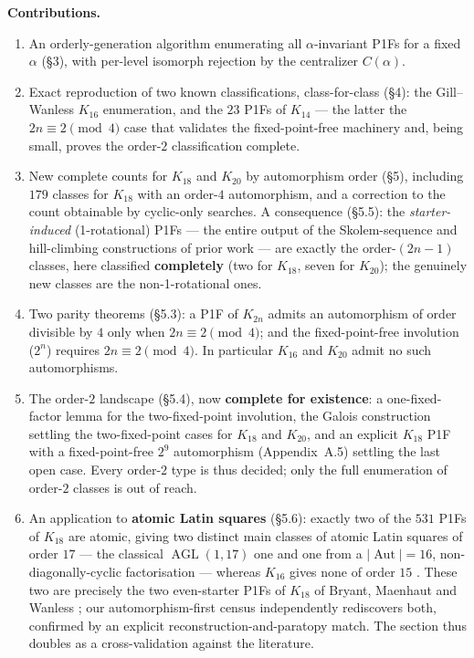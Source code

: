 \documentclass[11pt,reqno]{amsart}
\theoremstyle{plain}
\theoremstyle{definition}
\numberwithin{theorem}{section}
\newcommand{\Aut}{\operatorname{Aut}}
\newcommand{\AGL}{\operatorname{AGL}}
\begin{document}
\medskip
\noindent\textbf{Contributions.}
\begin{enumerate}
\item An orderly-generation algorithm enumerating all $\alpha$-invariant P1Fs for a
fixed $\alpha$ (\S3), with per-level isomorph rejection by the centralizer
$C(\alpha)$.
\item Exact reproduction of two known classifications, class-for-class (\S4): the
Gill--Wanless $K_{16}$ enumeration, and the $23$ P1Fs of $K_{14}$ --- the latter the
$2n\equiv 2\pmod 4$ case that validates the fixed-point-free machinery and, being
small, proves the order-$2$ classification complete.
\item New complete counts for $K_{18}$ and $K_{20}$ by automorphism order (\S5),
including $179$ classes for $K_{18}$ with an order-$4$ automorphism, and a
correction to the count obtainable by cyclic-only searches. A consequence (\S5.5):
the \emph{starter-induced} (1-rotational) P1Fs --- the entire output of the Skolem-sequence
and hill-climbing constructions of prior work --- are exactly the order-$(2n-1)$ classes,
here classified \textbf{completely} (two for $K_{18}$, seven for $K_{20}$); the genuinely new
classes are the non-1-rotational ones.
\item Two parity theorems (\S5.3): a P1F of $K_{2n}$ admits an automorphism of order
divisible by $4$ only when $2n\equiv2\pmod4$; and the fixed-point-free involution
($2^n$) requires $2n\equiv2\pmod4$. In particular $K_{16}$ and $K_{20}$ admit no such
automorphisms.
\item The order-$2$ landscape (\S5.4), now \textbf{complete for existence}: a one-fixed-factor
lemma for the two-fixed-point involution, the Galois construction settling the
two-fixed-point cases for $K_{18}$ and $K_{20}$, and an explicit $K_{18}$ P1F with a
fixed-point-free $2^9$ automorphism (Appendix~A.5) settling the last open case. Every
order-$2$ type is thus decided; only the full enumeration of order-$2$ classes is out
of reach.
\item An application to \textbf{atomic Latin squares} (\S5.6): exactly two of the $531$
P1Fs of $K_{18}$ are atomic, giving two distinct main classes of atomic Latin squares of
order $17$ --- the classical $\AGL(1,17)$ one and one from a $|\Aut|=16$, non-diagonally-cyclic
factorisation --- whereas $K_{16}$ gives none of order $15$ \cite{GillWanless}. These two are
precisely the two even-starter P1Fs of $K_{18}$ of Bryant, Maenhaut and Wanless
\cite{BryantMaenhautWanless}; our automorphism-first census independently rediscovers both,
confirmed by an explicit reconstruction-and-paratopy match. The section thus doubles as a
cross-validation against the literature.
\end{enumerate}
\end{document}
